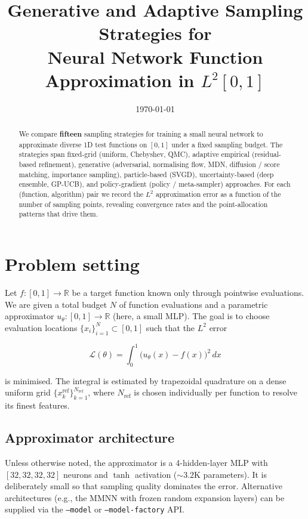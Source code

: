 \documentclass[11pt,a4paper]{article}
\title{Generative and Adaptive Sampling Strategies for \\
       Neural Network Function Approximation in $L^2[0,1]$}
\author{}
\date{\today}
\begin{document}
\maketitle

\begin{abstract}
We compare \textbf{fifteen} sampling strategies for training a small neural
network to approximate diverse 1D test functions on $[0,1]$ under a
fixed sampling budget.  The strategies span fixed-grid (uniform,
Chebyshev, QMC), adaptive empirical (residual-based refinement),
generative (adversarial, normalising flow, MDN, diffusion / score
matching, importance sampling), particle-based (SVGD), uncertainty-based
(deep ensemble, GP-UCB), and policy-gradient (policy / meta-sampler)
approaches.  For each (function, algorithm) pair we record the
$L^2$ approximation error as a function of the number of sampling points,
revealing convergence rates and the point-allocation patterns that
drive them.
\end{abstract}

\section{Problem setting}
\label{sec:problem}

Let $f:[0,1]\to\mathbb{R}$ be a target function known only through
pointwise evaluations.  We are given a total budget $N$ of function
evaluations and a parametric approximator $u_\theta:[0,1]\to\mathbb{R}$
(here, a small MLP).  The goal is to choose evaluation locations
$\{x_i\}_{i=1}^N\subset[0,1]$ such that the $L^2$ error

\begin{equation}\label{eq:l2loss}
  \mathcal{L}(\theta) = \int_0^1 \bigl(u_\theta(x) - f(x)\bigr)^2\,dx
\end{equation}

is minimised.  The integral is estimated by trapezoidal quadrature on a
dense uniform grid $\{x_k^{\mathrm{ref}}\}_{k=1}^{N_{\mathrm{ref}}}$,
where $N_{\mathrm{ref}}$ is chosen individually per function to resolve
its finest features.

\subsection{Approximator architecture}

Unless otherwise noted, the approximator is a 4-hidden-layer MLP with
$[32,32,32,32]$ neurons and $\tanh$ activation ($\sim 3.2$K parameters).
It is deliberately small so that sampling quality dominates the error.
Alternative architectures (e.g., the MMNN with frozen random expansion
layers) can be supplied via the \texttt{--model} or
\texttt{--model-factory} API.
\end{document}
